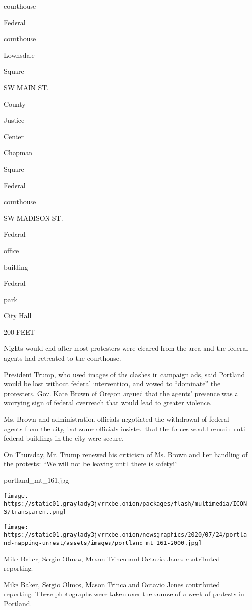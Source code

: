 courthouse

Federal

courthouse

Lownsdale

Square

SW MAIN ST.

County

Justice

Center

Chapman

Square

Federal

courthouse

SW MADISON ST.

Federal

office

building

Federal

park

City Hall

200 FEET

Nights would end after most protesters were cleared from the area and
the federal agents had retreated to the courthouse.

President Trump, who used images of the clashes in campaign ads, said
Portland would be lost without federal intervention, and vowed to
``dominate'' the protesters. Gov. Kate Brown of Oregon argued that the
agents' presence was a worrying sign of federal overreach that would
lead to greater violence.

Ms. Brown and administration officials negotiated the withdrawal of
federal agents from the city, but some officials insisted that the
forces would remain until federal buildings in the city were secure.

On Thursday, Mr. Trump
\href{https://twitter.com/realDonaldTrump/status/1288826742539464707}{renewed
his criticism} of Ms. Brown and her handling of the protests: ``We will
not be leaving until there is safety!''

portland\_mt\_161.jpg

\texttt{[image: https://static01.graylady3jvrrxbe.onion/packages/flash/multimedia/ICONS/transparent.png]}

\texttt{[image: https://static01.graylady3jvrrxbe.onion/newsgraphics/2020/07/24/portland-mapping-unrest/assets/images/portland\_mt\_161-2000.jpg]}

Mike Baker, Sergio Olmos, Mason Trinca and Octavio Jones contributed
reporting.

Mike Baker, Sergio Olmos, Mason Trinca and Octavio Jones contributed
reporting. These photographs were taken over the course of a week of
protests in Portland.

